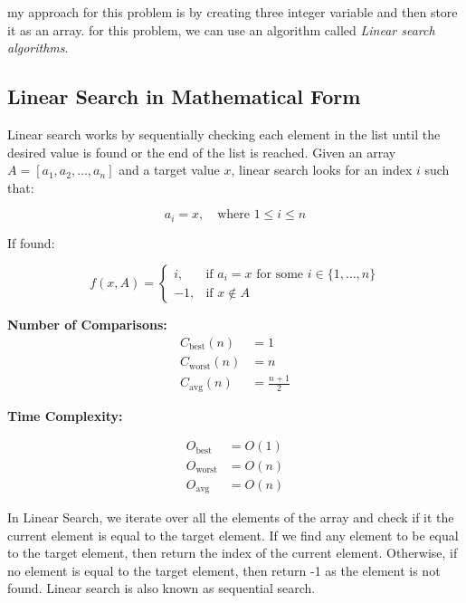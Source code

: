 \documentclass{article}
\begin{document}
  my approach for this problem is by creating three integer variable and then store it as an array. for this problem, we can use 
  an algorithm called \textit{Linear search algorithms}. 

  \subsection{Linear Search in Mathematical Form}
  
  
  Linear search works by sequentially checking each element in the list until the desired value is found or the end of the list is reached.
  Given an array $A = [a_1, a_2, \dots, a_n]$ and a target value $x$, linear search looks for an index $i$ such that:
  
  \[
  a_i = x, \quad \text{where } 1 \leq i \leq n
  \]
  
  If found:
  
  \[
  f(x, A) =
  \begin{cases}
  i, & \text{if } a_i = x \text{ for some } i \in \{1, \dots, n\} \\
  -1, & \text{if } x \notin A
  \end{cases}
  \]
  
  \textbf{Number of Comparisons:}
  \[
  \begin{aligned}
  C_{\text{best}}(n) &= 1 \\
  C_{\text{worst}}(n) &= n \\
  C_{\text{avg}}(n) &= \frac{n + 1}{2}
  \end{aligned}
  \]
  
  \textbf{Time Complexity:}
  
  \[
  \begin{aligned}
  O_{\text{best}} &= O(1) \\
  O_{\text{worst}} &= O(n) \\
  O_{\text{avg}} &= O(n)
  \end{aligned}
  \]

  In Linear Search, we iterate over all the elements of the array and check if it the current element is equal to the target element. If we find any element to be equal to the target element, then return the index of the current element. Otherwise, if no element is equal to the target element, then return -1 as the element is not found. Linear search is also known as sequential search.
  
\end{document}
